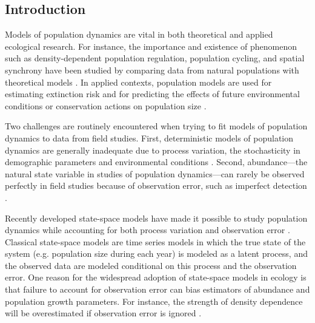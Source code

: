 \documentclass[12pt,english]{article}
\begin{document}
\begin{spacing}{1.9}
\begin{flushleft}
\section*{Introduction}
Models of population dynamics are vital in both theoretical and
applied ecological research. For instance, 
the importance and existence of phenomenon such as
density-dependent population regulation, population cycling, and
spatial synchrony have been studied by comparing data from natural
populations with theoretical models
\citep{may:1975,turchin:1990,bjornstad_etal:1999}. 
In applied contexts, population models are used for estimating extinction risk 
\citep{nadeem_lele:2011,hostetler_etal:2012} and for predicting the 
effects of future environmental conditions or conservation actions on
population size \citep{jamieson_brooks:2004,hatfield_etal:2012}.

Two challenges are routinely encountered when trying to fit models 
of population dynamics to data from field studies. 
First, deterministic models of population dynamics are generally inadequate due to process 
variation, the stochasticity in demographic parameters and environmental 
conditions \citep{bjornstad_grenfell:2001,saether_engen:2002}.
Second, abundance---the natural state variable in studies
of population dynamics---can rarely be observed perfectly in field
studies because of observation error, such as imperfect
detection \citep{link_nichols:1994,kery_etal:2009}.

Recently developed state-space models 
have made it possible to
study population dynamics while accounting for both process variation
and observation error \citep{devalpine_hastings:2002,
  buckland_etal:2004, dennis_etal:2006}. Classical state-space
models are time series models in which the true state of the
system (e.g. population size during each year) is modeled as a latent 
process, and the observed data are modeled conditional on this process
and the observation error. One reason for the widespread adoption of
state-space models in ecology is that failure to account for 
observation error can bias estimators of abundance and
population growth parameters. For instance, the strength of
density dependence will be overestimated if observation error is
ignored \citep{link_nichols:1994,shenk_etal:1998}.


\end{flushleft}
\end{spacing}
\end{document}

